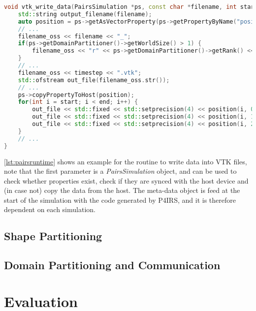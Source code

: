 \documentclass[preprint,12pt]{elsarticle}
\begin{document}
\begin{lstlisting}[language=C++,
		   label={lst:pairsruntime},
	   	   caption={P4IRS runtime routine example for writing VTK data into a file.}]
void vtk_write_data(PairsSimulation *ps, const char *filename, int start, int end, int timestep) {
    std::string output_filename(filename);
    auto position = ps->getAsVectorProperty(ps->getPropertyByName("position"));
    // ...
    filename_oss << filename << "_";
    if(ps->getDomainPartitioner()->getWorldSize() > 1) {
        filename_oss << "r" << ps->getDomainPartitioner()->getRank() << "_";
    }
    // ...
    filename_oss << timestep << ".vtk";
    std::ofstream out_file(filename_oss.str());
    // ...
    ps->copyPropertyToHost(position);
    for(int i = start; i < end; i++) {
        out_file << std::fixed << std::setprecision(4) << position(i, 0) << " ";
        out_file << std::fixed << std::setprecision(4) << position(i, 1) << " ";
        out_file << std::fixed << std::setprecision(4) << position(i, 2) << "\n";
    }
    // ...
}
\end{lstlisting}

\autoref{lst:pairsruntime} shows an example for the routine to write data into VTK files, note that the first parameter is a \emph{PairsSimulation} object, and can be used to check whether properties exist, check if they are synced with the host device and (in case not) copy the data from the host.
The meta-data object is feed at the start of the simulation with the code generated by P4IRS, and it is therefore dependent on each simulation.

\subsection{Shape Partitioning}
\label{sec:shape_partitioning}

\subsection{Domain Partitioning and Communication}
\label{sec:domain_partitioning}


\section{Evaluation}
\label{sec:evaluation}
\end{document}
